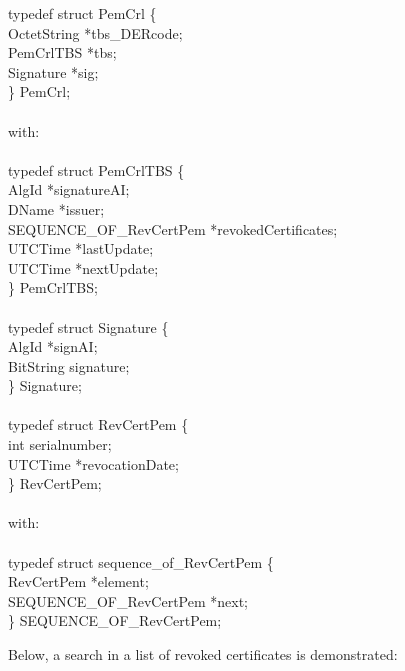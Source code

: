 {\small
\btab
\1      typedef struct PemCrl \{  \\
\2              OctetString \5  *tbs\_DERcode; \\
\2              PemCrlTBS  \5   *tbs;        \\
\2              Signature \5    *sig; \\
\1      \} PemCrl;  \\ \\
with: \\ \\
\1      typedef struct PemCrlTBS \{ \\
\2              AlgId \5        *signatureAI; \\
\2              DName \5         *issuer; \\
\2              SEQUENCE\_OF\_RevCertPem \5     *revokedCertificates; \\
\2              UTCTime  \5     *lastUpdate; \\
\2              UTCTime  \5     *nextUpdate; \\
\1       \} PemCrlTBS; \\ \\
\1      typedef struct Signature \{  \\
\2              AlgId \5        *signAI; \\
\2              BitString \5    signature; \\
\1 \}           Signature;  \\ \\
\1      typedef struct RevCertPem \{ \\
\2              int  \5          serialnumber; \\
\2              UTCTime \5      *revocationDate; \\
\1      \} RevCertPem;  \\ \\
with: \\ \\
\1      typedef struct sequence\_of\_RevCertPem \{ \\
\2              RevCertPem          \5 *element; \\
\2              SEQUENCE\_OF\_RevCertPem \5 *next; \\
\1      \} SEQUENCE\_OF\_RevCertPem;  \\
\etab
}

Below, a search in a list of revoked certificates is demonstrated:

